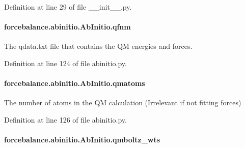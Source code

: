 Definition at line 29 of file \-\_\-\-\_\-init\-\_\-\-\_\-.\-py.

\hypertarget{classforcebalance_1_1abinitio_1_1AbInitio_ac93db408472034937e79572bf872886c}{
\paragraph[{qfnm}]{\setlength{\rightskip}{0pt plus 5cm}forcebalance.\-abinitio.\-Ab\-Initio.\-qfnm\hspace{0.3cm}{\ttfamily [inherited]}}}\label{classforcebalance_1_1abinitio_1_1AbInitio_ac93db408472034937e79572bf872886c}


The qdata.\-txt file that contains the Q\-M energies and forces. 



Definition at line 124 of file abinitio.\-py.

\hypertarget{classforcebalance_1_1abinitio_1_1AbInitio_af0760b8d33ce9dd044ccbe68fba7a1be}{
\paragraph[{qmatoms}]{\setlength{\rightskip}{0pt plus 5cm}forcebalance.\-abinitio.\-Ab\-Initio.\-qmatoms\hspace{0.3cm}{\ttfamily [inherited]}}}\label{classforcebalance_1_1abinitio_1_1AbInitio_af0760b8d33ce9dd044ccbe68fba7a1be}


The number of atoms in the Q\-M calculation (Irrelevant if not fitting forces) 



Definition at line 126 of file abinitio.\-py.

\hypertarget{classforcebalance_1_1abinitio_1_1AbInitio_a06ec6b12d81791ca94f599f41e56335a}{
\paragraph[{qmboltz\-\_\-wts}]{\setlength{\rightskip}{0pt plus 5cm}forcebalance.\-abinitio.\-Ab\-Initio.\-qmboltz\-\_\-wts\hspace{0.3cm}{\ttfamily [inherited]}}}\label{classforcebalance_1_1abinitio_1_1AbInitio_a06ec6b12d81791ca94f599f41e56335a}


